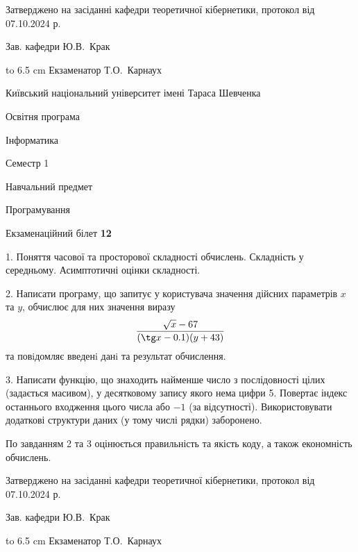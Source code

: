 \documentclass[12pt, ukrainian]{article}
\begin{document}
{\smallskip\smallskip \begin {scriptsize} Затверджено на засіданні кафедри теоретичної кібернетики, протокол   від   07.10.2024 р.\par\smallskip\smallskip\smallskip\smallskip
{\parbox {6.5 cm} {Зав. кафедри \dotfill Ю.В.~Крак}}\hspace {0.7cm} {\hbox to 6.5 cm { Екзаменатор \dotfill Т.О.~Карнаух}} \end{scriptsize}}
\vspace{0.9cm}
{{\begin {scriptsize}\par
{ \center  Київський національний університет імені Тараса Шевченка \par}
{\parbox {5 cm}{Освітня програма \hfill}{\parbox {7 cm}{Інформатика\hfill}}\parbox {6 cm}{\hfill Семестр 1}}\par
{\parbox {5 cm} {Навчальний предмет \hfill}\parbox {7 cm}{Програмування \hfill}\parbox {6cm}{\hfill}\par}\vspace{-15pt} \end{scriptsize}}{\center Екзаменаційний білет \No \textbf { 12 }\par}}
{%
1. Поняття часової та просторової складності обчислень. Складність у середньому. Асимптотичні оцінки складності.%
\par
2. Написати програму, що запитує у користувача значення дійсних параметрів $x$ та $y$, обчислює для них значення виразу 
$$\frac{\sqrt x - 67}{(\tg x - 0.1) (y + 43)}$$ 
та повiдомляє введенi данi та результат обчислення.

\par
3. Написати функцію, що знаходить найменше число з послідовності цілих (задається масивом), у десятковому запису якого нема цифри 5. Повертає індекс останнього входження цього числа або $-1$ (за відсутності). Використовувати додаткові структури даних (у тому числі рядки) заборонено.

По завданням 2 та 3 оцінюється правильність та якість коду, а також економність обчислень.

}
{\smallskip\smallskip \begin {scriptsize} Затверджено на засіданні кафедри теоретичної кібернетики, протокол   від   07.10.2024 р.\par\smallskip\smallskip\smallskip\smallskip
{\parbox {6.5 cm} {Зав. кафедри \dotfill Ю.В.~Крак}}\hspace {0.7cm} {\hbox to 6.5 cm { Екзаменатор \dotfill Т.О.~Карнаух}} \end{scriptsize}}
\end{document}
